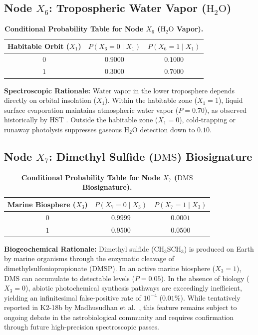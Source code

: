 \subsection{Node $X_6$: Tropospheric Water Vapor ($\mathrm{H}_2\mathrm{O}$)}
\begin{table}[htbp]
\centering
\caption{\textbf{Conditional Probability Table for Node $X_6$ ($\mathrm{H}_2\mathrm{O}$ Vapor).}}
\label{tab:cpt_x6}
\small
\begin{tabular}{ccc}
\toprule
\textbf{Habitable Orbit ($X_1$)} & $P(X_6 = 0 \mid X_1)$ & $P(X_6 = 1 \mid X_1)$ \\
\midrule
$0$ & $0.9000$ & $0.1000$ \\
$1$ & $0.3000$ & $0.7000$ \\
\bottomrule
\end{tabular}
\end{table}
\textbf{Spectroscopic Rationale:} Water vapor in the lower troposphere depends directly on orbital insolation ($X_1$). Within the habitable zone ($X_1=1$), liquid surface evaporation maintains atmospheric water vapor ($P = 0.70$), as observed historically by HST \cite{benneke2019}. Outside the habitable zone ($X_1=0$), cold-trapping or runaway photolysis suppresses gaseous $\mathrm{H}_2\mathrm{O}$ detection down to $0.10$.

\subsection{Node $X_7$: Dimethyl Sulfide ($\mathrm{DMS}$) Biosignature}
\begin{table}[htbp]
\centering
\caption{\textbf{Conditional Probability Table for Node $X_7$ ($\mathrm{DMS}$ Biosignature).}}
\label{tab:cpt_x7}
\small
\begin{tabular}{ccc}
\toprule
\textbf{Marine Biosphere ($X_3$)} & $P(X_7 = 0 \mid X_3)$ & $P(X_7 = 1 \mid X_3)$ \\
\midrule
$0$ & $0.9999$ & $0.0001$ \\
$1$ & $0.9500$ & $0.0500$ \\
\bottomrule
\end{tabular}
\end{table}
\textbf{Biogeochemical Rationale:} Dimethyl sulfide ($\mathrm{CH}_3\mathrm{SCH}_3$) is produced on Earth by marine organisms through the enzymatic cleavage of dimethylsulfoniopropionate (DMSP). In an active marine biosphere ($X_3=1$), DMS can accumulate to detectable levels ($P = 0.05$). In the absence of biology ($X_3=0$), abiotic photochemical synthesis pathways are exceedingly inefficient, yielding an infinitesimal false-positive rate of $10^{-4}$ ($0.01\%$). While tentatively reported in K2-18b by Madhusudhan et al.~\cite{madhusudhan2023}, this feature remains subject to ongoing debate in the astrobiological community and requires confirmation through future high-precision spectroscopic passes.

